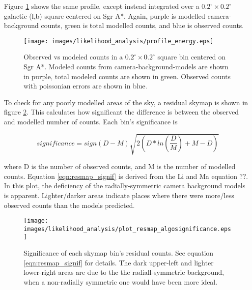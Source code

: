   Figure \ref{fig:gc_profile_energy} shows the same profile, except instead integrated over a ${0.2}^{\circ}\times{0.2}^{\circ}$ galactic (l,b) square centered on Sgr A*.
  Again, purple is modelled camera-background counts, green is total modelled counts, and blue is observed counts.
  
  \begin{figure}[h]
    \centering
    \texttt{[image: images/likelihood\_analysis/profile\_energy.eps]}
    \caption[Galactic Center Profile vs Energy]{
      Observed vs modeled counts in a ${0.2}^{\circ}\times{0.2}^{\circ}$ square bin centered on Sgr A*.
      Modeled counts from camera-background-models are shown in purple, total modeled counts are shown in green.
      Observed counts with poissonian errors are shown in blue.
    }
    \label{fig:gc_profile_energy}
  \end{figure}
  
  To check for any poorly modelled areas of the sky, a residual skymap is shown in figure \ref{fig:gc_resmap}.
  This calculates how significant the difference is between the observed and modelled number of counts.
  Each bin's significance is 
  
  \begin{equation}
    \label{eqn:resmap_signif}
    significance = sign(D-M) \sqrt{ 2 \left ( D * ln \left ( \frac{D}{M} \right ) + M - D \right ) }
  \end{equation}
  
  where D is the number of observed counts, and M is the number of modelled counts.
  Equation \ref{eqn:resmap_signif} is derived from the Li and Ma equation ??. 
  In this plot, the deficiency of the radially-symmetric camera background models is apparent.
  Lighter/darker areas indicate places where there were more/less observed counts than the models predicted.
  
  \begin{figure}[ht]
    \centering
    \texttt{[image: images/likelihood\_analysis/plot\_resmap\_algosignificance.eps]}
    \caption[Galactic Center Residual Map]
    {
      Significance of each skymap bin's residual counts.
      See equation \ref{eqn:resmap_signif} for details.
      The dark upper-left and lighter lower-right areas are due to the the radiall-symmetric background, when a non-radially symmetric one would have been more ideal.
    }
    \label{fig:gc_resmap}
  \end{figure}

